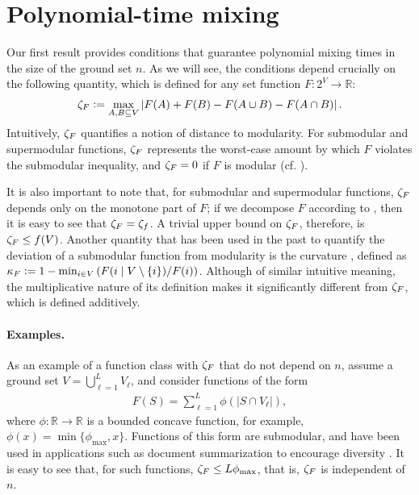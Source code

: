 \section{Polynomial-time mixing} \label{sect:poly}
Our first result provides conditions that guarantee polynomial mixing times in the size of the ground set $n$.
As we will see, the conditions depend crucially on the following quantity, which is defined for any set function $F : 2^V \to \mathbb{R}$:
\begin{align*}
  \zeta_F \vcentcolon= \max_{A, B \subseteq V} \left|F(A) + F(B) - F(A \cup B) - F(A \cap B) \right|.
\end{align*}
Intuitively, $\zeta_F$ quantifies a notion of distance to modularity.
For submodular and supermodular functions, $\zeta_F$ represents the worst-case amount by which $F$ violates the submodular inequality, and $\zeta_F = 0$ if $F$ is modular (cf. ).

It is also important to note that, for submodular and supermodular functions, $\zeta_F$ depends only on the monotone part of $F$; if we decompose $F$ according to , then it is easy to see that $\zeta_F = \zeta_f$.
A trivial upper bound on $\zeta_F$, therefore, is $\zeta_F \leq f(V)$.
Another quantity that has been used in the past to quantify the deviation of a submodular function from modularity is the curvature \citep{conforti84}, defined as $\kappa_F \vcentcolon= 1 - \min_{i \in V} \left(F(i\mid V\setminus\{i\}) / F(i)\right)$.
Although of similar intuitive meaning, the multiplicative nature of its definition makes it significantly different from $\zeta_F$, which is defined additively.

\paragraph{Examples.}
As an example of a function class with $\zeta_F$ that do not depend on $n$, assume a ground set $V = \bigcup_{\ell = 1}^L V_{\ell}$, and consider functions of the form
\begin{align*}
F(S) = \sum_{\ell = 1}^L \phi(|S \cap V_{\ell}|),
\end{align*}
where $\phi : \mathbb{R} \to \mathbb{R}$ is a bounded concave function, for example, $\phi(x) = \min\{\phi_{\max}, x\}$.
Functions of this form are submodular, and have been used in applications such as document summarization to encourage diversity \citep{lin11}.
It is easy to see that, for such functions, $\zeta_F \leq L\phi_{\max}$, that is, $\zeta_F$ is independent of $n$.

